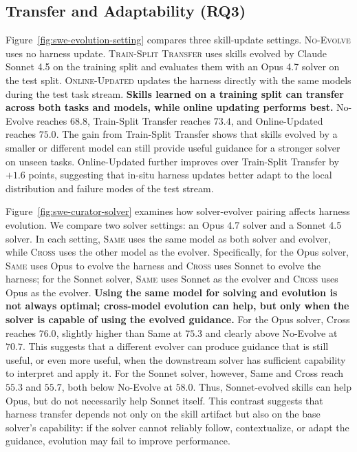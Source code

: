 \subsection{Transfer and Adaptability (RQ3)}
\label{sec:exp-transfer}



Figure~\ref{fig:swe-evolution-setting} compares three skill-update settings. \textsc{No-Evolve} uses no harness update. \textsc{Train-Split Transfer} uses skills evolved by Claude Sonnet 4.5 on the training split and evaluates them with an Opus 4.7 solver on the test split. \textsc{Online-Updated} updates the harness directly with the same models during the test task stream. 
\textbf{Skills learned on a training split can transfer across both tasks and models, while online updating performs best.}
No-Evolve reaches $68.8$, Train-Split Transfer reaches $73.4$, and Online-Updated reaches $75.0$. The gain from Train-Split Transfer shows that skills evolved by a smaller or different model can still provide useful guidance for a stronger solver on unseen tasks. Online-Updated further improves over Train-Split Transfer by $+1.6$ points, suggesting that in-situ harness updates better adapt to the local distribution and failure modes of the test stream.

Figure~\ref{fig:swe-curator-solver} examines how solver-evolver pairing affects harness evolution. We compare two solver settings: an Opus 4.7 solver and a Sonnet 4.5 solver. In each setting, \textsc{Same} uses the same model as both solver and evolver, while \textsc{Cross} uses the other model as the evolver. Specifically, for the Opus solver, \textsc{Same} uses Opus to evolve the harness and \textsc{Cross} uses Sonnet to evolve the harness; for the Sonnet solver, \textsc{Same} uses Sonnet as the evolver and \textsc{Cross} uses Opus as the evolver.
\textbf{Using the same model for solving and evolution is not always optimal; cross-model evolution can help, but only when the solver is capable of using the evolved guidance.}
For the Opus solver, Cross reaches $76.0$, slightly higher than Same at $75.3$ and clearly above No-Evolve at $70.7$. This suggests that a different evolver can produce guidance that is still useful, or even more useful, when the downstream solver has sufficient capability to interpret and apply it. For the Sonnet solver, however, Same and Cross reach $55.3$ and $55.7$, both below No-Evolve at $58.0$. Thus, Sonnet-evolved skills can help Opus, but do not necessarily help Sonnet itself. This contrast suggests that harness transfer depends not only on the skill artifact but also on the base solver’s capability: if the solver cannot reliably follow, contextualize, or adapt the guidance, evolution may fail to improve performance.

